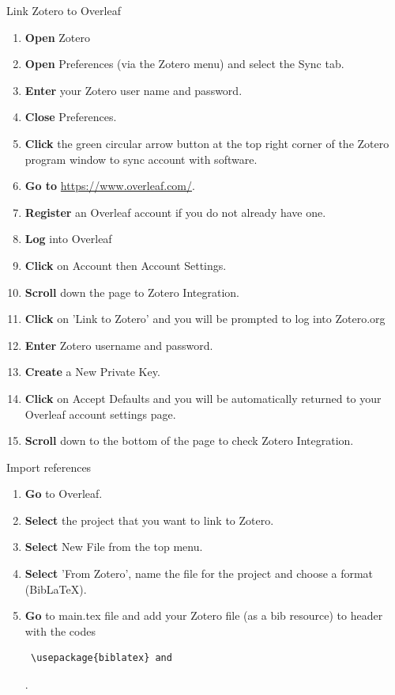 \documentclass[10pt,a4paper]{article}
\begin{document}
\begin{textbox}{Link Zotero to Overleaf}
 

  

\begin{enumerate}
\item \textbf{Open} Zotero
\item \textbf{Open} Preferences (via the Zotero menu) and select the Sync tab.
\item \textbf {Enter} your Zotero user name and password.
\item \textbf {Close} Preferences.
\item \textbf {Click} the green circular arrow button at the top right corner of the Zotero program window to sync account with software.
\item \textbf{Go to}  \href{https://www.overleaf.com/}{https://www.overleaf.com/}. 
\item \textbf{Register} an Overleaf account if you do not already have one.
\item \textbf {Log} into Overleaf
\item \textbf {Click} on Account then Account Settings.
\item \textbf {Scroll} down the page to Zotero Integration.
\item \textbf {Click} on 'Link to Zotero' and you will be prompted to log into Zotero.org
\item \textbf {Enter} Zotero username and password.
\item \textbf {Create} a New Private Key.
\item \textbf {Click} on Accept Defaults and you will be automatically returned to your Overleaf account settings page.
\item \textbf {Scroll} down to the bottom of the page to check Zotero Integration.
\end{enumerate}

\end{textbox}

 
 \begin{textbox}{Import references}
 

  

\begin{enumerate}
\item \textbf {Go} to Overleaf. 
\item \textbf {Select} the project that you want to link to Zotero.
\item \textbf {Select} New File from the top menu.
\item \textbf {Select} 'From Zotero', name the file for the project and choose a format (BibLaTeX).
\item \textbf {Go} to main.tex file and add your Zotero file (as a bib resource) to header with the codes \begin{verbatim} \usepackage{biblatex} and \end{verbatim}.
\end{enumerate}

\end{textbox}
\end{document}
